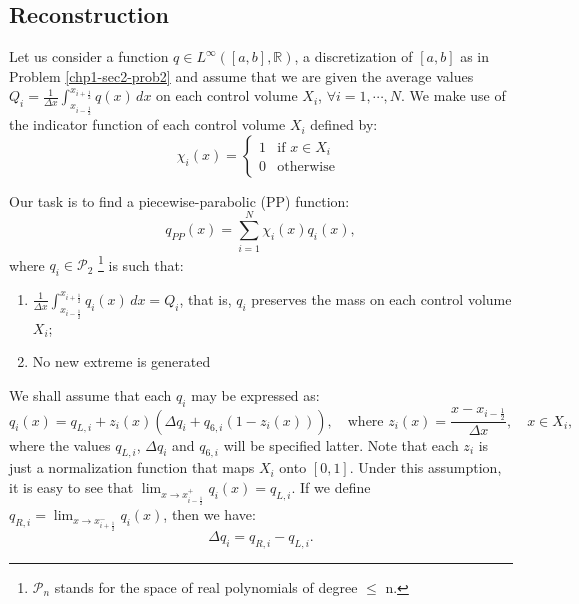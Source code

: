 \subsection{Reconstruction}
\label{chp1-sec-recon}
Let us consider a function ${q} \in L^{\infty}([a, b],\mathbb{R})$, a discretization of
$[a,b]$ as in Problem \ref{chp1-sec2-prob2}
and assume that we are given the average values ${Q}_i = \frac{1}{\Delta x} 
\int_{x_{i-\frac{1}{2}}}^{x_{i+\frac{1}{2}}} {q}(x) \,dx$
on each control volume $X_i$, $\forall i = 1, \cdots, N $.
We make use of the indicator function of each control volume $X_i$ defined by:
\begin{equation}
	\label{chp1-sec3-1-eq1}
	\chi_{i}(x)=
	\begin{cases}
		1 & \text{if } x \in X_i\\
		0 & \text{otherwise }
	\end{cases}
\end{equation}

Our task is to find a piecewise-parabolic (PP) 
function:
\begin{equation}
	\label{chp1-sec3-1-eq2}
	q_{PP}(x) = \sum_{i=1}^{N} \chi_i(x) q_i(x),
\end{equation}
where ${q}_i \in \mathcal{P}_2$
\footnote{$\mathcal{P}_n$ stands for the space of real polynomials of degree $\leq$ n.} 
is such that:
\begin{enumerate}
	\item $\frac{1}{\Delta x}\int_{x_{i-\frac{1}{2}}}^{x_{i+\frac{1}{2}}} {q}_i(x) \,dx = {Q}_i$,
	that is, $q_i$ preserves the mass on each control volume $X_i$;
	\item No new extreme is generated%
\end{enumerate}

We shall assume that each $q_i$ may be expressed as:
\begin{equation}
	\label{chp1-sec-recon-ppm-eq1}
	q_i(x) = q_{L, i} + z_i(x)(\Delta q_i + q_{6, i}(1-z_i(x))), 
	\quad \text{where }
	z_i(x) = \frac{x-x_{i-\frac{1}{2}}}{\Delta x},
	\quad x \in X_i,
\end{equation}
where the values $q_{L, i}$, $\Delta q_i$ and $q_{6, i}$  will be specified latter.
Note that each $z_i$ is just a normalization function that maps $X_i$ onto $[0,1]$.
Under this assumption, it is easy to see that 
$\lim_{x \to x_{i-\frac{1}{2}}^+} {q_i(x)} = q_{L, i}$.
If we define $q_{R, i} = \lim_{x \to x_{i+\frac{1}{2}}^-} {q_i(x)}$,
then we have:
\begin{equation}
	\label{chp1-sec-recon-ppm-eq2}
	\Delta q_i = q_{R, i} - q_{L, i}.
\end{equation}

